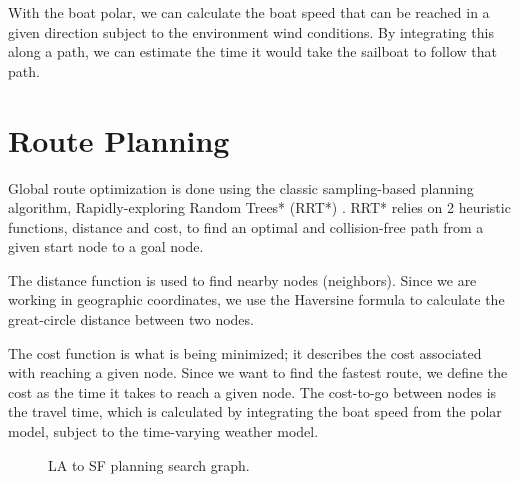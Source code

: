 \documentclass[conference]{IEEEtran}
\begin{document}
With the boat polar, we can calculate the boat speed that can be reached in a given direction subject to the environment wind conditions. By integrating this along a path, we can estimate the time it would take the sailboat to follow that path.

\section{Route Planning}
\label{section:route_planning}
Global route optimization is done using the classic sampling-based planning algorithm, Rapidly-exploring Random Trees* (RRT*) \cite{RRT-star}. RRT* relies on 2 heuristic functions, distance and cost, to find an optimal and collision-free path from a given start node to a goal node.

The distance function is used to find nearby nodes (neighbors). Since we are working in geographic coordinates, we use the Haversine formula to calculate the great-circle distance between two nodes.

The cost function is what is being minimized; it describes the cost associated with reaching a given node. Since we want to find the fastest route, we define the cost as the time it takes to reach a given node. The cost-to-go between nodes is the travel time, which is calculated by integrating the boat speed from the polar model, subject to the time-varying weather model.

\begin{figure}[!ht]
    \centering
    \caption{LA to SF planning search graph.}
    \label{fig:lasf_search}
\end{figure}
\end{document}
